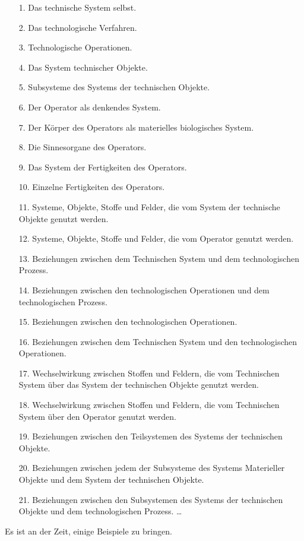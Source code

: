 \documentclass[11pt,a4paper]{article}
\begin{document}
\begin{itemize}\itemsep0pt
\item[1.] Das technische System selbst.
\item[2.] Das technologische Verfahren.
\item[3.] Technologische Operationen.
\item[4.] Das System technischer Objekte.
\item[5.] Subsysteme des Systems der technischen Objekte.
\item[6.] Der Operator als denkendes System.
\item[7.] Der Körper des Operators als materielles biologisches System.
\item[8.] Die Sinnesorgane des Operators.
\item[9.] Das System der Fertigkeiten des Operators.
\item[10.] Einzelne Fertigkeiten des Operators.
\item[11.] Systeme, Objekte, Stoffe und Felder, die vom System der technische
  Objekte genutzt werden.
\item[12.] Systeme, Objekte, Stoffe und Felder, die vom Operator genutzt
  werden.
\item[13.] Beziehungen zwischen dem Technischen System und dem technologischen
  Prozess.
\item[14.] Beziehungen zwischen den technologischen Operationen und dem
  technologischen Prozess.
\item[15.] Beziehungen zwischen den technologischen Operationen.
\item[16.] Beziehungen zwischen dem Technischen System und den technologischen
  Operationen.
\item[17.] Wechselwirkung zwischen Stoffen und Feldern, die vom Technischen
  System über das System der technischen Objekte genutzt werden.
\item[18.] Wechselwirkung zwischen Stoffen und Feldern, die vom Technischen
  System über den Operator genutzt werden.
\item[19.] Beziehungen zwischen den Teilsystemen des Systems der technischen
  Objekte.
\item[20.] Beziehungen zwischen jedem der Subsysteme des Systems Materieller
  Objekte und dem System der technischen Objekte.
\item[21.] Beziehungen zwischen den Subsystemen des Systems der technischen
  Objekte und dem technologischen Prozess. \ldots
\end{itemize}
Es ist an der Zeit, einige Beispiele zu bringen. 
\end{document}
